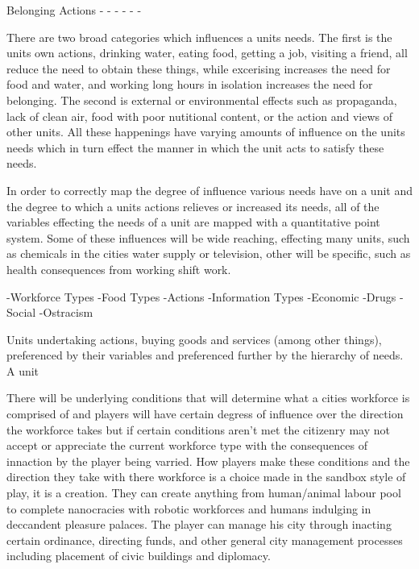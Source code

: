 Belonging Actions
-
-
-
-
-
-


There are two broad categories which influences a units needs. The first is the units own actions, drinking water, eating food, getting a job, visiting a friend, all reduce the need to obtain these things, while excerising increases the need for food and water, and working long hours in isolation increases the need for belonging. The second is external or environmental effects such as propaganda, lack of clean air, food with poor nutitional content, or the action and views of other units. All these happenings have varying amounts of influence on the units needs which in turn effect the manner in which the unit acts to satisfy these needs.

In order to correctly map the degree of influence various needs have on a unit and the degree to which a units actions relieves or increased its needs, all of the variables effecting the needs of a unit are mapped with a quantitative point system. Some of these influences will be wide reaching, effecting many units, such as chemicals in the cities water supply or television, other will be specific, such as health consequences from working shift work. 


-Workforce Types
-Food Types
-Actions
-Information Types
-Economic 
-Drugs
-Social
-Ostracism



%
%
%
%
%
%
%







Units undertaking actions, buying goods and services (among other things), preferenced by their variables and preferenced further by the hierarchy of needs. A unit 



 



There will be underlying conditions that will determine what a cities workforce is comprised of and players will have certain degress of influence over the direction the workforce takes but if certain conditions aren't met the citizenry may not accept or appreciate the current workforce type with the consequences of innaction by the player being varried. How players make these conditions and the direction they take with there workforce is a choice made in the sandbox style of play, it is a creation. They can create anything from human/animal labour pool to complete nanocracies with robotic workforces and humans indulging in deccandent pleasure palaces. The player can manage his city through inacting certain ordinance, directing funds, and other general city management processes including placement of civic buildings and diplomacy. 
